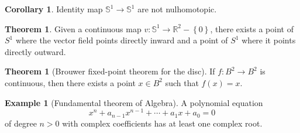 \documentclass[12pt,a4paper]{book}
\newenvironment{prooff}{{\noindent\it\textcolor{cyan!40!black}{Proof}:}\,}{\par}
\newcommand{\bbrace}[1]{\left\{ #1 \right\} }
\newcommand{\bb}[1]{\mathbb{#1}}
\theoremstyle{definition}
\newtheorem{coro}[defn]{Corollary}
\newtheorem{theo}[defn]{Theorem}
\newtheorem{exam}[defn]{Example}
\begin{document}
\begin{coro}
    Identity map $\bb{S}^1\rightarrow \bb{S}^1$ are not nulhomotopic.
\end{coro}
\begin{theo}
    Given a continuous map $v:\bb{S}^1\rightarrow \bb{R}^2-\bbrace{0}$, there exists a point of $S^1$ where the vector field points directly inward and a point of $S^1$ where it points directly outward.
\end{theo}

\begin{theo}[Brouwer fixed-point theorem for the disc]
    If $f: B^2 \rightarrow B^2$ is continuous, then there exists a point $x \in B^2$ such that $f(x)=x$.
\end{theo}
\begin{exam}[Fundamental theorem of Algebra]
    A polynomial equation
    $$
        x^n+a_{n-1} x^{n-1}+\cdots+a_1 x+a_0=0
    $$
    of degree $n>0$ with complex coefficients has at least one complex root.
\end{exam}
\end{document}
